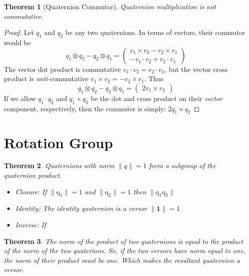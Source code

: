 \documentclass{amsart}
\newtheorem{theorem}{Theorem}[section]
\theoremstyle{definition}
\theoremstyle{remark}
\numberwithin{equation}{section}
\begin{document}
\begin{theorem}[Quaternion Commutor]
  Quaternion multiplication is not commutative.
\end{theorem}
\begin{proof}
  Let $q_1$ and $q_2$ be any two quaternions. In terms of vectors, their commutor would be
  \begin{equation}
    q_1\otimes q_2-q_2\otimes q_1
    =
    \begin{pmatrix}
      v_1 \times v_2 - v_2 \times v_1 \\
      -v_1\cdot v_2 +v_2\cdot v_1
    \end{pmatrix}
  \end{equation}
  The vector dot product is commutative $v_1\cdot v_2 = v_2\cdot v_1$, but the vector cross product is \emph{anti-}commutative $v_1\times v_2 = -v_2 \times v_1$. Thus
  \begin{equation}
    q_1\otimes q_2-q_2\otimes q_1 =
    \begin{pmatrix}
      2v_1\times v_2
    \end{pmatrix}
  \end{equation}
  If we allow $q_1\cdot q_2$ and $q_1\times q_2$ be the dot and cross product on their \emph{vector} component, respectively, then the commuter is simply: $2q_1\times q_2$
\end{proof}


\section{Rotation Group}

\begin{theorem}
  Quaternions with norm $\|q\|=1$ form a subgroup of the quaternion product.
	\begin{itemize}
		\item Closure: If $\|\mathrm{q}_1\|=1$ and $\|\mathrm{q}_2\|=1$ then $\|\mathrm{q}_1\mathrm{q}_2\|$
		\item Identity: The identity quaternion is a versor $\|\mathbf{1}\|=1$
		\item Inverse: If 
	\end{itemize}
\end{theorem}

\begin{theorem}
  The norm of the product of two quaternions is equal to the product of the norm of the two quaterions. So, if the two versors have norm equal to one, the norm of their product must be one. Which makes the resultant quaternion a versor.
\end{theorem}
\end{document}
